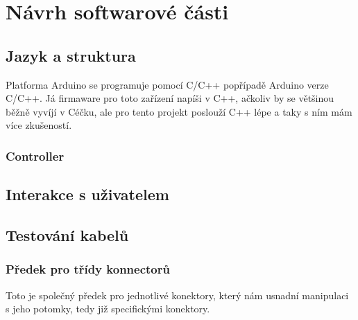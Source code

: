 
\section{Návrh softwarové části}

\subsection{Jazyk a struktura}
Platforma Arduino se programuje pomocí C/C++ popřípadě Arduino verze C/C++. Já firmaware pro toto zařízení napíši v C++, ačkoliv by se většinou běžně vyvíjí v Céčku, ale pro tento projekt poslouží C++ lépe a taky s ním mám více zkušeností.
\newpage
\subsubsection{Controller}


\subsection{Interakce s uživatelem}

\subsection{Testování kabelů}
\newpage
\subsubsection{Předek pro třídy konnectorů}

Toto je společný předek pro jednotlivé konektory, který nám usnadní manipulaci s jeho potomky, tedy již specifickými konektory.
